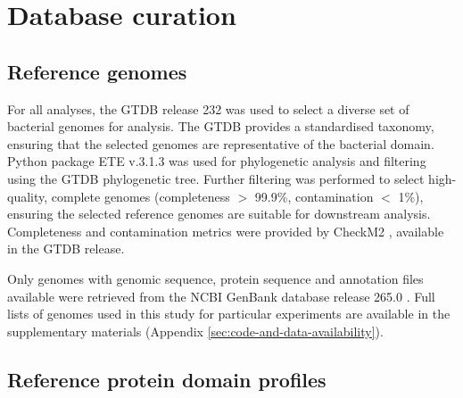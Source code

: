 \section{Database curation}





\subsection{Reference genomes}
\label{subsec:reference-genomes}

For all analyses, the \ac{GTDB} release 232 \citep{Parks2022} was used to select a diverse set of bacterial genomes for analysis. 
The GTDB provides a standardised taxonomy, ensuring that the selected genomes are representative of the bacterial domain. 
Python package \ac{ETE} v.3.1.3 \citep{huertacepas2016} was used for phylogenetic analysis and filtering using the \ac{GTDB} phylogenetic tree.
Further filtering was performed to select high-quality, complete genomes (completeness $>$ 99.9\%, contamination $<$ 1\%), ensuring the selected reference genomes are suitable for downstream analysis.
Completeness and contamination metrics were provided by CheckM2 \citep{Chklovski2023}, available in the \ac{GTDB} release.

Only genomes with genomic sequence, protein sequence and annotation files available were retrieved from the \ac{NCBI} GenBank database release 265.0 \citep{OLeary2024}.
Full lists of genomes used in this study for particular experiments are available in the supplementary materials (Appendix \ref{sec:code-and-data-availability}).

\subsection{Reference protein domain profiles}
\label{subsec:protein-hmm-retrieval}

